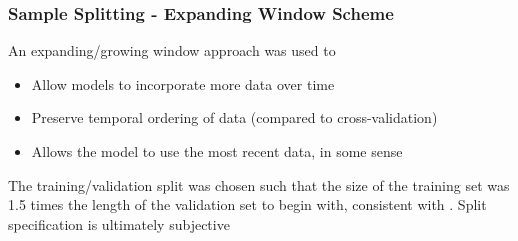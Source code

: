 \documentclass[aspectratio=169]{beamer}
\begin{document}

\begin{frame}
\frametitle{Sample Splitting - Expanding Window Scheme}
An expanding/growing window approach was used to
\begin{itemize}
	\item Allow models to incorporate more data over time
	\item Preserve temporal ordering of data (compared to cross-validation)
	\item Allows the model to use the most recent data, in some sense
\end{itemize}
The training/validation split was chosen such that the size of the training set was 1.5 times the length of the validation set to begin with, consistent with \cite{gu_empirical_2018}.
Split specification is ultimately subjective
\end{frame}
\end{document}
